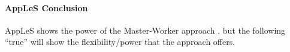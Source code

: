 \documentclass{sig-alternate}
\begin{document}
\paragraph{AppLeS Conclusion}
AppLeS shows the power of the Master-Worker approach ,
but the following ``true'' \pilotjobs will show the flexibility/power
that the \pilotjob approach offers.





\end{document}

